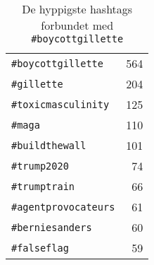 \begin{table}[htpb]
\centering
\captionsetup{justification=centering,singlelinecheck=off}
\caption{
  De hyppigste hashtags forbundet med \texttt{\#boycottgillette}
}
\begin{tabular}{lr}

\texttt{\#boycottgillette}   & 564 \\
\texttt{\#gillette}          & 204 \\
\texttt{\#toxicmasculinity}  & 125 \\
\texttt{\#maga}              & 110 \\
\texttt{\#buildthewall}      & 101 \\
\texttt{\#trump2020}         & 74 \\
\texttt{\#trumptrain}        & 66 \\
\texttt{\#agentprovocateurs} & 61 \\
\texttt{\#berniesanders}     & 60 \\
\texttt{\#falseflag}         & 59

\end{tabular}
\end{table}

